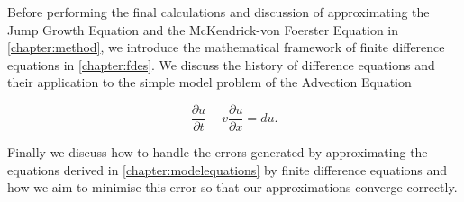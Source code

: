 \documentclass[../main]{subfiles}
\begin{document}
  Before performing the final calculations and discussion of approximating the Jump Growth Equation and the McKendrick-von Foerster Equation in \autoref{chapter:method}, we introduce the mathematical framework of finite difference equations in \autoref{chapter:fdes}. We discuss the history of difference equations and their application to the simple model problem of the Advection Equation

  \begin{equation}
    \frac{\partial u}{\partial t} + v \frac{\partial u}{\partial x} = d u.
  \end{equation}

  Finally we discuss how to handle the errors generated by approximating the equations derived in \autoref{chapter:modelequations} by finite difference equations and how we aim to minimise this error so that our approximations converge correctly.
\end{document}
